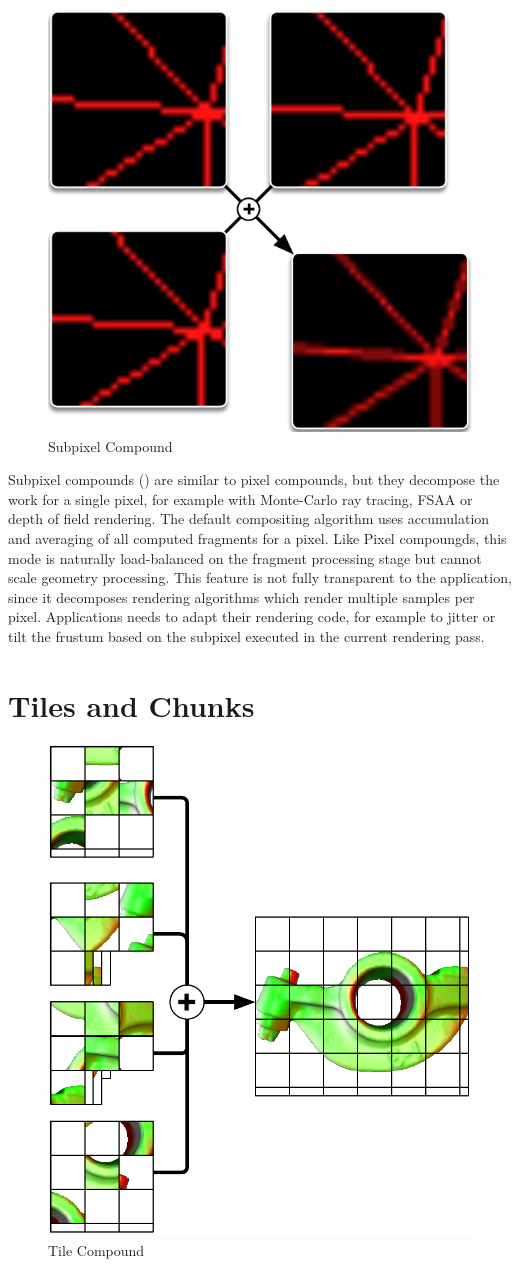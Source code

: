 \begin{figure}
 \includegraphics[width=.382\textwidth]{images/Subpixel}
 {\caption{\label{fSubpixel}Subpixel Compound}}
\end{figure}

Subpixel compounds () are similar to pixel compounds, but they
decompose the work for a single pixel, for example with Monte-Carlo ray tracing,
FSAA or depth of field rendering. The default compositing algorithm uses
accumulation and averaging of all computed fragments for a pixel. Like Pixel
compoungds, this mode is naturally load-balanced on the fragment processing
stage but cannot scale geometry processing. This feature is not fully
transparent to the application, since it decomposes rendering algorithms which
render multiple samples per pixel. Applications needs to adapt their rendering
code, for example to jitter or tilt the frustum based on the subpixel executed
in the current rendering pass.

\section{Tiles and Chunks}

\begin{figure}
 \includegraphics[width=.382\textwidth]{images/tile}
 {\caption{\label{fTiles}Tile Compound}}
\end{figure}

